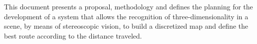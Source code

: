 This document presents a proposal, methodology and defines the planning for the development of a system that allows the recognition of three-dimensionality in a scene, by means of stereoscopic vision, to build a discretized map and define the best route according to the distance traveled.